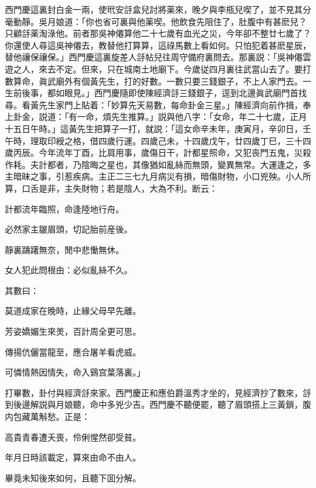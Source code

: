 西門慶這裏封白金一兩，使玳安㧱盒兒討將薬來，晚夕與李瓶兒喫了，並不見其分毫動靜。吳月娘道：「你也省可裏與他薬喫。他飲食先阻住了，肚腹中有甚麽兒？只顧㧱薬淘淥他。前者那吳神僊算他二十七歲有血光之災，今年卻不整廿七歲了？你還使人尋這吳神僊去，教替他打算算，這祿馬數上看如何。只怕犯着甚麽星辰，替他禳保禳保。」西門慶這裏旋差人㧱帖兒往周守備府裏問去。那裏説：「吳神僊雲遊之人，來去不定。但來，只在城南土地廟下。今歲従四月裏往武當山去了。要打數算命，眞武廟外有個黃先生，打的好數。一數只要三錢銀子，不上人家門去。一生前後事，都如眼見。」西門慶隨即使陳經濟㧱三錢銀子，逕到北邊眞武廟門首找尋。看黃先生家門上貼着：「妙算先天易數，每命卦金三星。」陳經濟向前作揖，奉上卦金，説道：「有一命，煩先生推算。」説與他八字：「女命，年二十七歲，正月十五日午時。」這黃先生把算子一打，就説：「這女命辛未年，庚寅月，辛卯日，壬午時，理取印綬之格，借四歲行運。四歲己未，十四歲戊午，廿四歲丁巳，三十四歲丙辰。今年流年丁酉，比肩用事，歲傷日干，計都星照命，又犯丧門五鬼，災殺作耗。夫計都者，乃陰晦之星也，其像猶如亂絲而無頭，變異無常。大運逢之，多主暗昧之事，引惹疾病。主正二三七九月病災有損，暗傷財物，小口兇殃。小人所算，口舌是非，主失財物；若是陰人，大為不利。断云：

\begin{myquote}
計都流年臨照，命逢陸地行舟。

必然家主皺眉頭，切記胎前産後。

靜裏躊躇無奈，閒中悲慟無休。

女人犯此問根由：必似亂絲不久。　
\end{myquote}

其數曰：

\begin{myquote}
莫道成家在晚時，止緣父母早先離。

芳姿嬌媚生來羙，百計周全更可思。

傳揚伉儷當龍至，應合屠羊看虎威。

可憐情熱因情失，命入鷄宫葉落裏。」
\end{myquote}

打畢數，卦付與經濟㧱來家。西門慶正和應伯爵溫秀才坐的，見經濟抄了數來，㧱到後邊解説與月娘聽，命中多兇少吉。西門慶不聽便罷，聽了眉頭搭上三黃鎖，腹内包藏萬斛愁。正是：

\begin{myquote}
高貴青春遭夭喪，伶俐惺然卻受貧。

年月日時該載定，算來由命不由人。
\end{myquote}

畢竟未知後來如何，且聽下囬分解。

